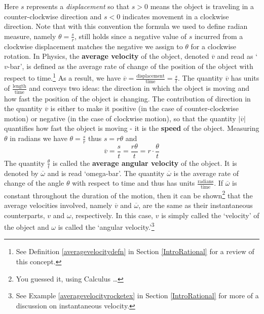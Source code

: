 \documentclass{ximera}
\begin{document}
Here $s$ represents a \textit{displacement} so that  $s > 0$ means the object is traveling in a counter-clockwise direction and $s<0$ indicates movement in a clockwise direction. Note that with this convention the formula we used to define radian measure, namely $\theta = \frac{s}{r}$, still holds since a negative value of $s$ incurred from a clockwise displacement matches the negative we assign to $\theta$ for a clockwise rotation.   In Physics, the \textbf{average velocity}  of the object, denoted $\overline{v}$ and read as `$v$-bar', is defined as the average rate of change of the position of the object with respect to time.\footnote{See Definition \ref{averagevelocitydefn} in Section \ref{IntroRational} for a review of this concept.} As a result, we have $\overline{v} = \frac{\text{displacement}}{\text{time}} = \frac{s}{t}$.  The quantity $\overline{v}$ has units of $\frac{\text{length}}{\text{time}}$ and conveys two ideas:  the direction in which the object is moving and how fast the position of the object is changing.  The contribution of direction in the quantity $\overline{v}$ is either to make it positive (in the case of counter-clockwise motion) or negative (in the case of clockwise motion), so that the quantity $\left| \overline{v} \right|$ quantifies how fast the object is moving - it is the \textbf{speed} of the object. Measuring $\theta$ in radians we have $\theta = \frac{s}{r}$ thus $s = r \theta$ and  \[ \overline{v} = \frac{s}{t} = \frac{r \theta}{t} = r \cdot \frac{\theta}{t} \] The quantity $\frac{\theta}{t}$ is called the \textbf{average angular velocity} of the object.  It is denoted by $\overline{\omega}$ and is read `omega-bar'.  The quantity $\overline{\omega}$ is the average rate of change of the angle $\theta$ with respect to time and thus has units $\frac{\text{radians}}{\text{time}}$. If $\overline{\omega}$ is constant throughout the duration of the motion, then it can be shown\footnote{You guessed it, using Calculus \ldots} that the average  velocities involved, namely $\overline{v}$ and $\overline{\omega}$, are the same as their instantaneous counterparts, $v$ and $\omega$, respectively.  In this case, $v$ is simply called the `velocity' of the object  and  $\omega$ is called the `angular velocity.'\footnote{See Example \ref{averagevelocityrocketex} in Section \ref{IntroRational} for more of a discussion on instantaneous velocity.}  
\smallskip
\end{document}
